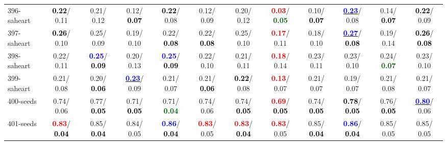 \begin{table}[h]
\begin{center}
{\begin{tabular}{lc|c|c|c|c|c|c|c|c|c|c}
396-saheart & \textcolor{black}{\textbf{  0.22}}/  0.11 &   0.21/  0.12 &   0.12/\textcolor{black}{\textbf{  0.07}} & \textcolor{black}{\textbf{  0.22}}/  0.08 &   0.12/  0.09 &   0.20/  0.12 & \textcolor{red}{\textbf{  0.03}}/\textcolor{darkgreen}{\textbf{  0.05}} &   0.10/\textcolor{black}{\textbf{  0.07}} & \underline{\textcolor{blue}{\textbf{  0.23}}}/  0.08 &   0.14/\textcolor{black}{\textbf{  0.07}} & \textcolor{black}{\textbf{  0.22}}/  0.09 \\
397-saheart & \textcolor{black}{\textbf{  0.26}}/  0.10 &   0.25/  0.09 &   0.19/  0.10 &   0.22/\textcolor{black}{\textbf{  0.08}} &   0.22/\textcolor{black}{\textbf{  0.08}} &   0.25/  0.10 & \textcolor{red}{\textbf{  0.17}}/  0.11 &   0.18/  0.10 & \underline{\textcolor{blue}{\textbf{  0.27}}}/\textcolor{black}{\textbf{  0.08}} &   0.19/  0.14 & \textcolor{black}{\textbf{  0.26}}/\textcolor{black}{\textbf{  0.08}} \\
398-saheart &   0.22/  0.11 & \textcolor{blue}{\textbf{  0.25}}/\textcolor{black}{\textbf{  0.09}} &   0.20/  0.13 & \textcolor{blue}{\textbf{  0.25}}/\textcolor{black}{\textbf{  0.09}} &   0.22/  0.10 &   0.21/  0.11 & \textcolor{red}{\textbf{  0.18}}/  0.14 &   0.23/  0.11 &   0.23/  0.10 &   0.24/\textcolor{darkgreen}{\textbf{  0.07}} &   0.23/  0.10 \\ \hline
399-saheart &   0.21/  0.08 &   0.20/\textcolor{black}{\textbf{  0.06}} & \underline{\textcolor{blue}{\textbf{  0.23}}}/  0.09 &   0.21/  0.07 &   0.21/\textcolor{black}{\textbf{  0.06}} & \textcolor{black}{\textbf{  0.22}}/  0.08 & \textcolor{red}{\textbf{  0.13}}/  0.07 &   0.21/  0.07 &   0.19/  0.07 &   0.21/  0.08 &   0.21/  0.07 \\
400-seeds &   0.74/  0.06 &   0.77/\textcolor{black}{\textbf{  0.05}} &   0.71/\textcolor{black}{\textbf{  0.05}} &   0.71/\textcolor{darkgreen}{\textbf{  0.04}} &   0.74/  0.06 &   0.74/\textcolor{black}{\textbf{  0.05}} & \textcolor{red}{\textbf{  0.69}}/\textcolor{black}{\textbf{  0.05}} &   0.74/\textcolor{black}{\textbf{  0.05}} & \textcolor{black}{\textbf{  0.78}}/\textcolor{black}{\textbf{  0.05}} &   0.76/\textcolor{black}{\textbf{  0.05}} & \underline{\textcolor{blue}{\textbf{  0.80}}}/  0.06 \\
401-seeds & \textcolor{red}{\textbf{  0.83}}/\textcolor{black}{\textbf{  0.04}} &   0.85/\textcolor{black}{\textbf{  0.04}} &   0.84/  0.05 & \textcolor{blue}{\textbf{  0.86}}/\textcolor{black}{\textbf{  0.04}} & \textcolor{red}{\textbf{  0.83}}/  0.05 & \textcolor{red}{\textbf{  0.83}}/\textcolor{black}{\textbf{  0.04}} & \textcolor{red}{\textbf{  0.83}}/  0.05 &   0.85/\textcolor{black}{\textbf{  0.04}} & \textcolor{blue}{\textbf{  0.86}}/\textcolor{black}{\textbf{  0.04}} &   0.85/  0.05 &   0.85/  0.05 \\

\end{tabular}}
\end{center}
\end{table}

